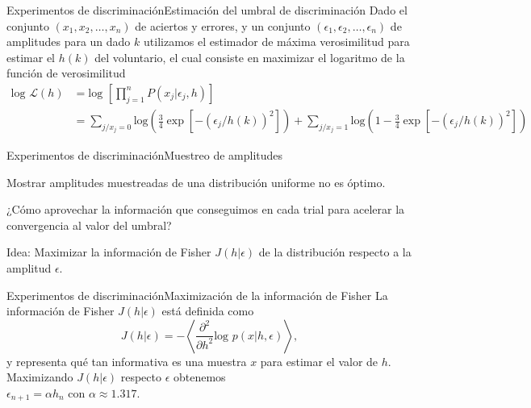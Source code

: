 \documentclass[
    11pt, %
    aspectratio=169, %
]{beamer}
\begin{document}
\begin{frame}{Experimentos de discriminación}{Estimación del umbral de discriminación}
Dado el conjunto $(x_1,x_2,\dots,x_n)$ de aciertos y errores, y un conjunto $(\epsilon_1,\epsilon_2,\dots,\epsilon_n)$ de amplitudes para un dado $k$ utilizamos el estimador de máxima verosimilitud para estimar el $h(k)$ del voluntario,
el cual consiste en maximizar el logaritmo de la función de verosimilitud
\vspace{1cm}
    \begin{align*}
    \text{log } \mathcal{L}(h) &= \text {log } \displaystyle\left[\prod_{j=1}^n P(x_j|\epsilon_j,h)\right] \\
     &= \displaystyle\sum_{j / x_j = 0} \text{log}\left(\displaystyle\frac{3}{4}\exp\left[-(\epsilon_j/h(k))^2\right]\right) + \displaystyle\sum_{j/x_j = 1}\text{log}\left(1 - \displaystyle\frac{3}{4}\exp\left[-(\epsilon_j/h(k))^2\right]\right)
    \end{align*}
\end{frame}
\begin{frame}{Experimentos de discriminación}{Muestreo de amplitudes}
    \begin{block}{}
   Mostrar amplitudes muestreadas de una distribución uniforme no es óptimo.
    	\end{block}
\begin{block}{}
    ¿Cómo aprovechar la información que conseguimos en cada trial para acelerar la convergencia al valor del umbral?
    	\end{block}
\begin{block}{Idea:}
    \centering 
    Maximizar la información de Fisher $J(h|\epsilon)$ de la distribución respecto a la amplitud $\epsilon$.
    	\end{block}

\end{frame}
\begin{frame}{Experimentos de discriminación}{Maximización de la información de Fisher}
    La información de Fisher $J(h|\epsilon)$ está definida como 
    \begin{equation*}
        J(h|\epsilon) = -\displaystyle\left\langle\frac{\partial^2}{\partial h^2} \text{log }p(x|h,\epsilon) \right\rangle,
    \end{equation*}
 y representa qué tan informativa es una muestra $x$ para estimar el valor de $h$. \pause
\centering
\\
 Maximizando $J(h|\epsilon)$ respecto $\epsilon$ obtenemos \\
     $\epsilon_{n+1} = \alpha h_n \text{  con  } \alpha \approx 1.317$.


\end{frame}
\end{document}
